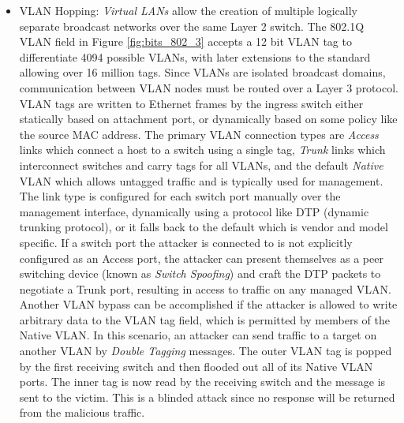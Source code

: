 \begin{itemize}
\item VLAN Hopping: \textit{Virtual LANs} allow the creation of multiple logically separate broadcast networks over the same Layer 2 switch. The 802.1Q VLAN field in Figure \ref{fig:bits_802_3} accepts a 12 bit VLAN tag to differentiate 4094 possible VLANs, with later extensions to the standard allowing over 16 million tags. Since VLANs are isolated broadcast domains, communication between VLAN nodes must be routed over a Layer 3 protocol. VLAN tags are written to Ethernet frames by the ingress switch either statically based on attachment port, or dynamically based on some policy like the source MAC address. The primary VLAN connection types are \textit{Access} links which connect a host to a switch using a single tag, \textit{Trunk} links which interconnect switches and carry tags for all VLANs, and the default \textit{Native} VLAN which allows untagged traffic and is typically used for management. The link type is configured for each switch port manually over the management interface, dynamically using a protocol like DTP (dynamic trunking protocol), or it falls back to the default which is vendor and model specific. If a switch port the attacker is connected to is not explicitly configured as an Access port, the attacker can present themselves as a peer switching device (known as \textit{Switch Spoofing}) and craft the DTP packets to negotiate a Trunk port, resulting in access to traffic on any managed VLAN. Another VLAN bypass can be accomplished if the attacker is allowed to write arbitrary data to the VLAN tag field, which is permitted by members of the Native VLAN. In this scenario, an attacker can send traffic to a target on another VLAN by \textit{Double Tagging} messages. The outer VLAN tag is popped by the first receiving switch and then flooded out all of its Native VLAN ports. The inner tag is now read by the receiving switch and the message is sent to the victim. This is a blinded attack since no response will be returned from the malicious traffic.
\end{itemize}



